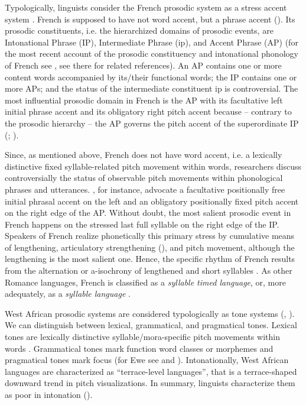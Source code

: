 \documentclass[output=paper]{langsci/langscibook}
\begin{document}
Typologically, linguists consider the French prosodic system as a stress accent system \citep{Hyman2006}. French is supposed to have not word accent, but a phrase accent (\citealt[460]{Hulstetal2010}). Its prosodic constituents, i.e. the hierarchized domains of prosodic events, are Intonational Phrase (IP), Intermediate Phrase (ip), and Accent Phrase (AP) (for the most recent account of the prosodic constituency and intonational phonology of French see \citealt{Delais-Roussarie2015}, see there for related references). An AP contains one or more content words accompanied by its/their functional words; the IP contains one or more APs; and the status of the intermediate constituent ip is controversial. The most influential prosodic domain in French is the AP with its facultative left initial phrase accent and its obligatory right pitch accent because – contrary to the prosodic hierarchy – the AP governs the pitch accent of the superordinate IP (\citealt{Jun2000,Jun2002}; \citealt[76]{Delais-Roussarie2015}). 

Since, as mentioned above, French does not have word accent, i.e. a lexically distinctive fixed syllable-related pitch movement within words, researchers discuss controversially the status of observable pitch movements within phonological phrases and utterances. \citet{Jun2002}, for instance, advocate a facultative positionally free initial phrasal accent on the left and an obligatory positionally fixed pitch accent on the right edge of the AP. Without doubt, the most salient prosodic event in French happens on the stressed last full syllable on the right edge of the IP. Speakers of French realize phonetically this primary stress by cumulative means of lengthening, articulatory strengthening (\citealt{Fougeron1997}), and pitch movement, although the lengthening is the most salient one. Hence, the specific rhythm of French results from the alternation or a-isochrony of lengthened and short syllables \citep{Dufter2004}. As other Romance languages, French is classified as a \textit{syllable timed language}, or, more adequately, as a \textit{syllable language} \citep{Auer2001}.

West African prosodic systems are considered typologically as tone systems (\citealt{Creissels1997,Hyman.2001,Hyman2006}, \citealt[381-427]{Hulstetal2010}). We can distinguish between lexical, grammatical, and pragmatical tones. Lexical tones are lexically distinctive syllable/mora-specific pitch movements within words \citep{Yip2002}. Grammatical tones mark function word classes or morphemes and pragmatical tones mark focus (for Ewe see \citealt[133-202]{Stahlke1971} and \citealt{Fiedler.2013}). Intonationally, West African languages are characterized as “terrace-level languages”, that is a terrace-shaped downward trend in pitch visualizations. In summary, linguists characterize them as poor in intonation (\citealt{Welmers1959,Kuegler.2016Akan}).
\end{document}

